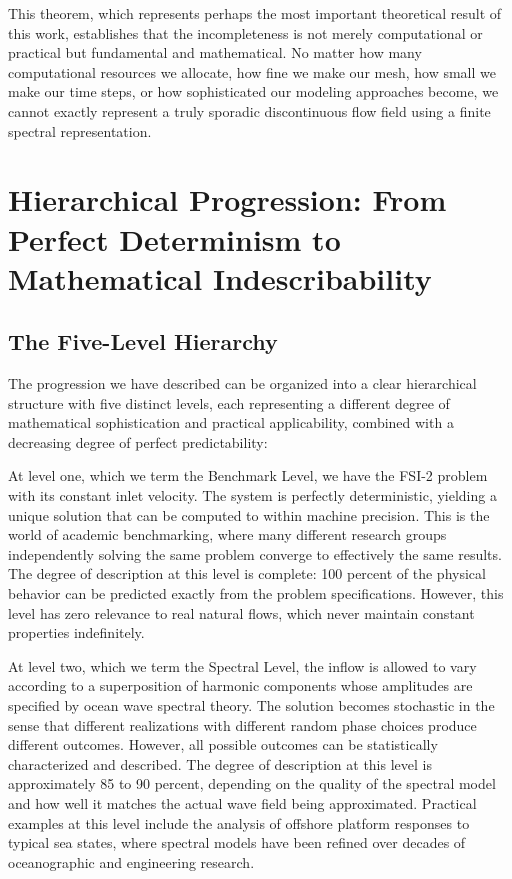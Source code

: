 ﻿\documentclass[a4paper,11pt]{article}
\theoremstyle{definition}
\begin{document}
This theorem, which represents perhaps the most important theoretical result of this work, establishes that the incompleteness is not merely computational or practical but fundamental and mathematical. No matter how many computational resources we allocate, how fine we make our mesh, how small we make our time steps, or how sophisticated our modeling approaches become, we cannot exactly represent a truly sporadic discontinuous flow field using a finite spectral representation.

\section{Hierarchical Progression: From Perfect Determinism to Mathematical Indescribability}

\subsection{The Five-Level Hierarchy}

The progression we have described can be organized into a clear hierarchical structure with five distinct levels, each representing a different degree of mathematical sophistication and practical applicability, combined with a decreasing degree of perfect predictability:

At level one, which we term the Benchmark Level, we have the FSI-2 problem with its constant inlet velocity. The system is perfectly deterministic, yielding a unique solution that can be computed to within machine precision. This is the world of academic benchmarking, where many different research groups independently solving the same problem converge to effectively the same results. The degree of description at this level is complete: 100 percent of the physical behavior can be predicted exactly from the problem specifications. However, this level has zero relevance to real natural flows, which never maintain constant properties indefinitely.

At level two, which we term the Spectral Level, the inflow is allowed to vary according to a superposition of harmonic components whose amplitudes are specified by ocean wave spectral theory. The solution becomes stochastic in the sense that different realizations with different random phase choices produce different outcomes. However, all possible outcomes can be statistically characterized and described. The degree of description at this level is approximately 85 to 90 percent, depending on the quality of the spectral model and how well it matches the actual wave field being approximated. Practical examples at this level include the analysis of offshore platform responses to typical sea states, where spectral models have been refined over decades of oceanographic and engineering research.
\end{document}

